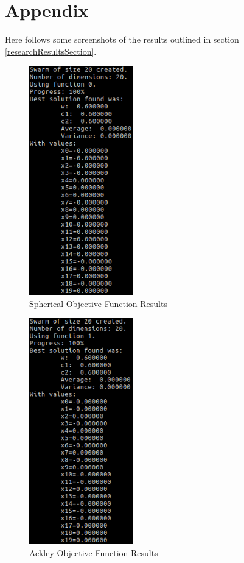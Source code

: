 \documentclass[hidelinks,english,conference]{IEEEtran}
\begin{document}
\section*{Appendix}
Here follows some screenshots of the results outlined in section \ref{researchResultsSection}.
\begin{figure}[!h]\centering
	\includegraphics[width=4.5cm]{spherical_results.png}
	\caption{Spherical Objective Function Results}
\end{figure}
\begin{figure}[!h]\centering
	\includegraphics[width=4.5cm]{ackley_results.png}
	\caption{Ackley Objective Function Results}
\end{figure}
\end{document}
